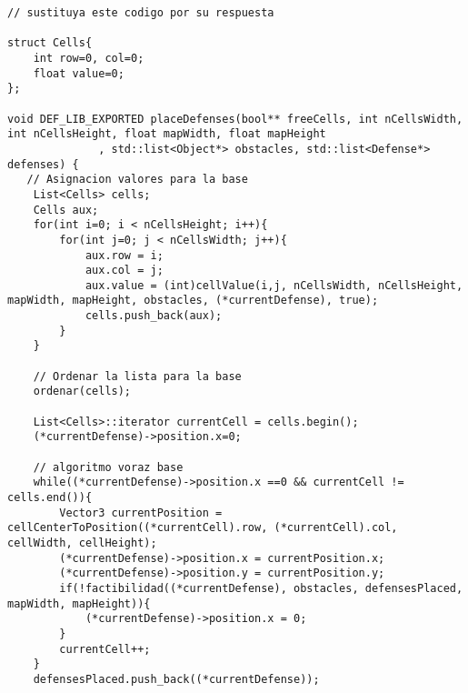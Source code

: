 \begin{lstlisting}
// sustituya este codigo por su respuesta

struct Cells{
    int row=0, col=0;
    float value=0;
};

void DEF_LIB_EXPORTED placeDefenses(bool** freeCells, int nCellsWidth, int nCellsHeight, float mapWidth, float mapHeight
              , std::list<Object*> obstacles, std::list<Defense*> defenses) {
   // Asignacion valores para la base
    List<Cells> cells;
    Cells aux;
    for(int i=0; i < nCellsHeight; i++){
        for(int j=0; j < nCellsWidth; j++){ 
            aux.row = i;
            aux.col = j;
            aux.value = (int)cellValue(i,j, nCellsWidth, nCellsHeight, mapWidth, mapHeight, obstacles, (*currentDefense), true); 
            cells.push_back(aux);
        }
    }

    // Ordenar la lista para la base
    ordenar(cells);

    List<Cells>::iterator currentCell = cells.begin();
    (*currentDefense)->position.x=0;
    
    // algoritmo voraz base
    while((*currentDefense)->position.x ==0 && currentCell != cells.end()){
        Vector3 currentPosition = cellCenterToPosition((*currentCell).row, (*currentCell).col, cellWidth, cellHeight);
        (*currentDefense)->position.x = currentPosition.x;
        (*currentDefense)->position.y = currentPosition.y;
        if(!factibilidad((*currentDefense), obstacles, defensesPlaced, mapWidth, mapHeight)){
            (*currentDefense)->position.x = 0;
        }
        currentCell++;
    }
    defensesPlaced.push_back((*currentDefense));
\end{lstlisting}
